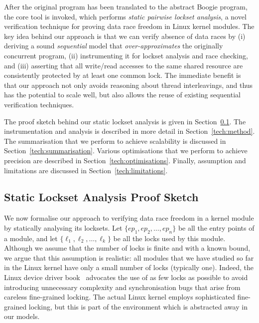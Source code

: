 After the original program has been translated to the abstract Boogie program, the core \whoop tool is invoked, which performs \emph{static pairwise lockset analysis}, a novel verification technique for proving data race freedom in Linux kernel modules. The key idea behind our approach is that we can verify absence of data races by (i) deriving a sound \emph{sequential} model that \emph{over-approximates} the originally concurrent program, (ii) instrumenting it for lockset analysis and race checking, and (iii) asserting that all write/read accesses to the same shared resource are consistently protected by at least one common lock. The immediate benefit is that our approach not only avoids reasoning about thread interleavings, and thus has the potential to scale well, but also allows the reuse of existing sequential verification techniques.

The proof sketch behind our static lockset analysis is given in Section~\ref{tech:proof}. The instrumentation and analysis is described in more detail in Section~\ref{tech:method}. The summarisation that we perform to achieve scalability is discussed in Section~\ref{tech:summarisation}. Various optimisations that we perform to achieve precision are described in Section~\ref{tech:optimisations}. Finally, assumption and limitations are discussed in Section~\ref{tech:limitations}.

\subsection{Static Lockset Analysis Proof Sketch}
\label{tech:proof}

We now formalise our approach to verifying data race freedom in a kernel module by statically analysing its locksets. Let $\{\mathit{ep}_{1}, \mathit{ep}_{2}, \dotsc, \mathit{ep}_{n}\}$ be all the entry points of a module, and let $\{\ell_{1}, \ell_{2}, \dotsc, \ell_{k}\}$ be all the locks used by this module. Although we assume that the number of locks is finite and with a known bound, we argue that this assumption is realistic: all modules that we have studied so far in the Linux kernel have only a small number of locks (typically one). Indeed, the Linux device driver book~\cite{corbet2005linux} advocates the use of as few locks as possible to avoid introducing unnecessary complexity and synchronisation bugs that arise from careless fine-grained locking. The actual Linux kernel employs sophisticated fine-grained locking, but this is part of the environment which is abstracted away in our models.

